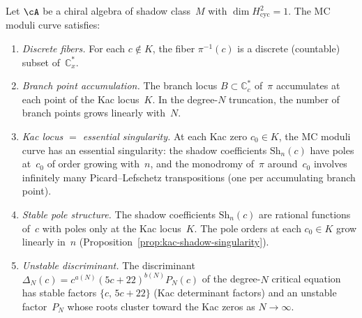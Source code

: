 \begin{theorem}
\label{thm:nms-mc-moduli-curve-structure}%
%
Let $\cA$ be a chiral algebra of shadow class~$M$ with
$\dim H^2_{\mathrm{cyc}} = 1$. The MC moduli curve satisfies:
\begin{enumerate}
\item[\textup{(a)}]
 \emph{Discrete fibers.} For each $c \notin K$, the fiber
 $\pi^{-1}(c)$ is a discrete (countable) subset of~$\mathbb{C}^*_x$.
\item[\textup{(b)}]
 \emph{Branch point accumulation.} The branch locus
 $B \subset \mathbb{C}^*_c$ of~$\pi$ accumulates at each point of the
 Kac locus~$K$. In the degree-$N$ truncation, the number of branch
 points grows linearly with~$N$.
\item[\textup{(c)}]
 \emph{Kac locus $=$ essential singularity.} At each Kac zero
 $c_0 \in K$, the MC moduli curve has an essential singularity:
 the shadow coefficients $\mathrm{Sh}_n(c)$ have poles at~$c_0$ of
 order growing with~$n$, and the monodromy of~$\pi$ around~$c_0$
 involves infinitely many Picard--Lefschetz transpositions
 (one per accumulating branch point).
\item[\textup{(d)}]
 \emph{Stable pole structure.} The shadow coefficients $\mathrm{Sh}_n(c)$
 are rational functions of~$c$ with poles only at the Kac
 locus~$K$. The pole orders at each $c_0 \in K$ grow linearly
 in~$n$ \textup{(}Proposition~\textup{\ref{prop:kac-shadow-singularity})}.
\item[\textup{(e)}]
 \emph{Unstable discriminant.} The discriminant
 $\Delta_N(c) = c^{a(N)} (5c+22)^{b(N)} P_N(c)$ of the degree-$N$
 critical equation has stable factors $\{c,\, 5c+22\}$ (Kac
 determinant factors) and an unstable factor~$P_N$ whose roots
 cluster toward the Kac zeros as $N \to \infty$.
\end{enumerate}
\end{theorem}

